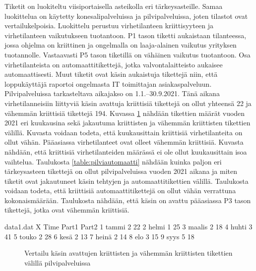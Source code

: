 Tiketit on luokiteltu viisiportaisella asteikolla eri tärkeysasteille. Samaa luokittelua on käytetty konesalipalveluissa ja pilvipalveluissa, joten tilastot ovat vertailukelpoisia. Luokittelu perustuu virhetilanteen kriittisyyteen ja virhetilanteen vaikutukseen tuotantoon. P1 tason tiketti aukaistaan tilanteessa, jossa ohjelma on kriittinen ja ongelmalla on laaja-alainen vaikutus yrityksen tuotannolle. Vastaavasti P5 tason tiketillä on vähäinen vaikutus tuotantoon. Osa virhetilanteista on automaattitikettejä, jotka valvontalaitteisto aukaisee automaattisesti. Muut tiketit ovat käsin aukaistuja tikettejä niin, että loppukäyttäjä raportoi ongelmasta IT toimittajan asiakaspalveluun. 
Pilvipalveluissa tarkasteltava aikajakso on 1.1.--30.9.2021. Tänä aikana virhetilanneisiin liittyviä käsin avattuja kriittisiä tikettejä on ollut yhteensä 22 ja vähemmän kriittisiä tikettejä 194. Kuvassa \ref{fig:pilvitiketit} nähdään tikettien määrät vuoden 2021 eri kuukausina sekä jakautuma kriittisten ja vähemmän kriittisten tikettien välillä. Kuvasta voidaan todeta, että kuukausittain kriittisiä virhetilanteita on ollut vähän. Pääasiassa virhetilanteet ovat olleet vähemmän kriittisiä. Kuvasta nähdään, että kriittisiä virhetilanteiden määrässä ei ole ollut kuukausittain isoa vaihtelua. Taulukosta \ref{table:pilviautomaatti} nähdään kuinka paljon eri tärkeysasteen tikettejä on ollut pilvipalveluissa vuoden 2021 aikana ja miten tiketit ovat jakautuneet käsin tehtyjen ja automaattitikettien välillä. Taulukosta voidaan todeta, että kriittisiä automaattitikettejä on ollut vähän verrattuna kokonaismäärään. Taulukosta nähdään, että käsin on avattu pääasiassa P3 tason tikettejä, jotka ovat vähemmän kriittisiä.

\begin{filecontents}{data1.dat}
X Time  	Part1  Part2
1 tammi  	2	    22
2 helmi		1	    25
3 maalis	2	    18
4 huhti		3	    41
5 touko		2	    28
6 kesä		2	    13
7 heinä		2	    14
8 elo       3       15
9 syys      5       18
\end{filecontents}

\begin{figure}[ht]
\caption{Vertailu käsin avattujen kriittisten ja vähemmän kriittisten tikettien välillä pilvipalveluissa}
\label{fig:pilvitiketit}
\end{figure}

